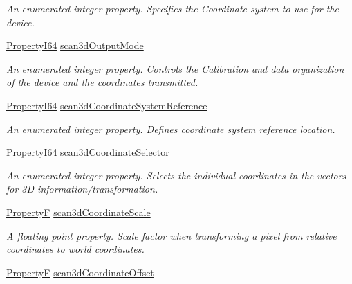 \begin{DoxyCompactItemize}
\begin{DoxyCompactList}\small\item\em An enumerated integer property. Specifies the Coordinate system to use for the device. \end{DoxyCompactList}\item 
\hyperlink{group___common_interface_ga81749b2696755513663492664a18a893}{Property\+I64} \hyperlink{classmv_i_m_p_a_c_t_1_1acquire_1_1_gen_i_cam_1_1_scan3d_control_aaa900a32cb8627e184f93bc0fa8b4767}{scan3d\+Output\+Mode}
\begin{DoxyCompactList}\small\item\em An enumerated integer property. Controls the Calibration and data organization of the device and the coordinates transmitted. \end{DoxyCompactList}\item 
\hyperlink{group___common_interface_ga81749b2696755513663492664a18a893}{Property\+I64} \hyperlink{classmv_i_m_p_a_c_t_1_1acquire_1_1_gen_i_cam_1_1_scan3d_control_a64896716a0dfaef9053d0643bc3e9196}{scan3d\+Coordinate\+System\+Reference}
\begin{DoxyCompactList}\small\item\em An enumerated integer property. Defines coordinate system reference location. \end{DoxyCompactList}\item 
\hyperlink{group___common_interface_ga81749b2696755513663492664a18a893}{Property\+I64} \hyperlink{classmv_i_m_p_a_c_t_1_1acquire_1_1_gen_i_cam_1_1_scan3d_control_a5835e12ee49c81f5e8a45a71c9f3f307}{scan3d\+Coordinate\+Selector}
\begin{DoxyCompactList}\small\item\em An enumerated integer property. Selects the individual coordinates in the vectors for 3\+D information/transformation. \end{DoxyCompactList}\item 
\hyperlink{group___common_interface_gaf54865fe5a3d5cfd15f9a111b40d09f9}{Property\+F} \hyperlink{classmv_i_m_p_a_c_t_1_1acquire_1_1_gen_i_cam_1_1_scan3d_control_ac68bf07316b5f192b6802f5969f9289b}{scan3d\+Coordinate\+Scale}
\begin{DoxyCompactList}\small\item\em A floating point property. Scale factor when transforming a pixel from relative coordinates to world coordinates. \end{DoxyCompactList}\item 
\hyperlink{group___common_interface_gaf54865fe5a3d5cfd15f9a111b40d09f9}{Property\+F} \hyperlink{classmv_i_m_p_a_c_t_1_1acquire_1_1_gen_i_cam_1_1_scan3d_control_a530c80388f9a2aae965b15ee31f69300}{scan3d\+Coordinate\+Offset}

\end{DoxyCompactItemize}
